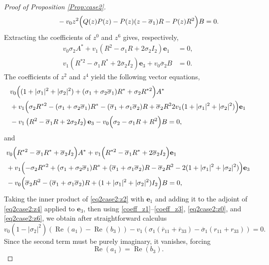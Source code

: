 \documentclass[10pt,a4paper]{amsart}
\begin{document}
\begin{proof}[Proof of Proposition \ref{Prop:case2}]
\begin{align}
		&\qquad \qquad - v_0 z^2\Bigl(  Q(z) P(z)  -  P(z) (z - \overline{\sigma}_1) R  - P(z) R^2\Bigr)   B = 0.\nonumber 
	\end{align}
	Extracting the coefficients of $z^0$ and $z^6$ gives, respectively,
	\begin{align}
		v_0 \sigma_2 A^* + v_1 \left( R^2 - \sigma_1 R + 2\sigma_2 I_2 \right) \mathbf{e}_1 &= 0, \label{eq2case2:z0} \\
		v_1 \left( R^{*2} - \overline{\sigma}_1 R^* + 2\overline{\sigma}_2 I_2 \right) \mathbf{e}_3 + v_0 \overline{\sigma}_2 B &= 0. \label{eq2case2:z6}
	\end{align}
	The coefficients of $z^2$ and $z^4$ yield the following vector equations,
	\begin{equation}\label{eq2case2:z2}   
		\begin{aligned}
			&v_0\Bigl( (1 + |\sigma_1|^2 + |\sigma_2|^2) +  (\sigma_1 + \sigma_2 \overline{\sigma}_1) R^*  + \sigma_2 R^{*2}\Bigr) A^* \\
			&+ v_1 \Bigl(\sigma_2 R^{*2} -(\sigma_1 + \sigma_2 \overline{\sigma}_1) R^* - (\overline{\sigma}_1 + \sigma_1 \overline{\sigma}_2) R + \overline{\sigma}_2 R^2 2v_1 (1 + |\sigma_1|^2 + |\sigma_2|^2)\Bigr) \mathbf{e}_1 \\
			&-v_1 \left( R^{2} - \overline{\sigma}_1 R + 2\sigma_2 I_2 \right) \mathbf{e}_3- v_0\Bigl( \sigma_2  - \sigma_1 R  + R^2\Bigr) B = 0,
		\end{aligned}
	\end{equation}
	and \begin{align}
		&	v_0 \Bigl( R^{*2} - \overline{\sigma}_1 R^* + \overline{\sigma}_2 I_2\Bigr) A^*+ v_1\Bigl( R^{*2} - \overline{\sigma}_1 R^* + 2\overline{\sigma}_2 I_2 \Bigr) \mathbf{e}_1 \nonumber \\
		&+ v_1\Bigl( -\sigma_2 R^{*2} + (\sigma_1 + \sigma_2 \overline{\sigma}_1) R^* + (\overline{\sigma}_1 + \sigma_1 \overline{\sigma}_2) R - \overline{\sigma}_2 R^2 - 2(1 + |\sigma_1|^2 + |\sigma_2|^2)\Bigr) \mathbf{e}_3  \label{eq2case2:z4}\\
		&- v_0 \Bigl(\overline{\sigma}_2 R^2 - (\overline{\sigma}_1 + \sigma_1 \overline{\sigma}_2) R + (1 + |\sigma_1|^2 + |\sigma_2|^2) I_2\Bigr) B = 0, \nonumber 
	\end{align}
	Taking the inner product of \eqref{eq2case2:z2} with $\mathbf{e}_1$ and adding it to the adjoint of \eqref{eq2case2:z4} applied to $\mathbf{e}_3$, then using  \eqref{coeff_z1}--\eqref{coeff_z3}, \eqref{eq2case2:z0}, and \eqref{eq2case2:z6}, we obtain after straightforward calculus 
	\begin{equation}\label{key_real2}
		v_0\left(1-\left|\sigma_2 \right|^2  \right) \left(\operatorname{Re}(a_1) -\operatorname{Re}(b_3)\right)-v_1\left( \sigma_1(\overline{r}_{11}+\overline{r}_{33})-\overline{\sigma}_1(r_{11}+r_{33})\right) = 0. 
	\end{equation}
	Since the second term must be purely imaginary, it vanishes, forcing
	\begin{equation}\label{key_real_eq}
		\operatorname{Re}(a_1) = \operatorname{Re}(b_3).	
	\end{equation}
	

\end{proof}
\end{document}

